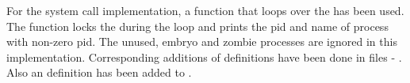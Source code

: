 \documentclass[12pt]{article}
\begin{document}
\vspace{5mm}
\begin{addmargin}[0.1in]{0in}
    For the {} system call implementation, a function that loops over the {} has been used. The function locks the {} during the loop and prints the pid and name of process with non-zero pid. The unused, embryo and zombie processes are ignored in this implementation. Corresponding additions of definitions have been done in files - {}. Also an {} definition has been added to {}.
\end{addmargin}
\end{document}
